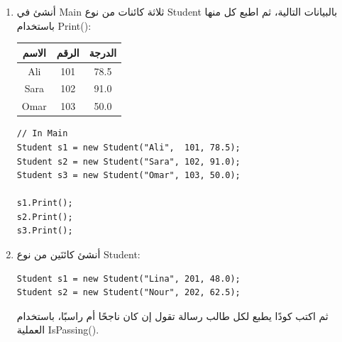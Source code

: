 \documentclass[14pt]{extarticle}
\begin{document}
\begin{enumerate}

\item %

أنشئ في \textenglish{Main} ثلاثة كائنات من نوع \textenglish{Student} بالبيانات التالية، ثم اطبع كل منها باستخدام \textenglish{Print()}:

\begin{center}
\begin{tabular}{|c|c|c|}
\hline
\textbf{الاسم} & \textbf{الرقم} & \textbf{الدرجة} \\
\hline
\textenglish{Ali}  & \textenglish{101} & \textenglish{78.5} \\
\textenglish{Sara} & \textenglish{102} & \textenglish{91.0} \\
\textenglish{Omar} & \textenglish{103} & \textenglish{50.0} \\
\hline
\end{tabular}
\end{center}

\ifwithsols
{\small
\begin{boxSolution}
\begin{english}
\begin{verbatim}
// In Main
Student s1 = new Student("Ali",  101, 78.5);
Student s2 = new Student("Sara", 102, 91.0);
Student s3 = new Student("Omar", 103, 50.0);

s1.Print();
s2.Print();
s3.Print();
\end{verbatim}
\end{english}
\end{boxSolution}
}
\clearpage
\fi

\item %

أنشئ كائنَين من نوع \textenglish{Student}:

\begin{english}
\begin{verbatim}
Student s1 = new Student("Lina", 201, 48.0);
Student s2 = new Student("Nour", 202, 62.5);
\end{verbatim}
\end{english}

ثم اكتب كودًا يطبع لكل طالب رسالة تقول إن كان ناجحًا أم راسبًا، باستخدام العملية \textenglish{IsPassing()}.


\end{enumerate}
\end{document}

